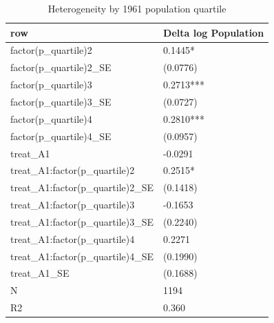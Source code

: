 \begin{table}

\caption{Heterogeneity by 1961 population quartile}
\centering
\begin{tabular}[t]{ll}
\toprule
row & Delta log Population\\
\midrule
factor(p\_quartile)2 & 0.1445*\\
factor(p\_quartile)2\_SE & (0.0776)\\
factor(p\_quartile)3 & 0.2713***\\
factor(p\_quartile)3\_SE & (0.0727)\\
factor(p\_quartile)4 & 0.2810***\\
\addlinespace
factor(p\_quartile)4\_SE & (0.0957)\\
treat\_A1 & -0.0291\\
treat\_A1:factor(p\_quartile)2 & 0.2515*\\
treat\_A1:factor(p\_quartile)2\_SE & (0.1418)\\
treat\_A1:factor(p\_quartile)3 & -0.1653\\
\addlinespace
treat\_A1:factor(p\_quartile)3\_SE & (0.2240)\\
treat\_A1:factor(p\_quartile)4 & 0.2271\\
treat\_A1:factor(p\_quartile)4\_SE & (0.1990)\\
treat\_A1\_SE & (0.1688)\\
N & 1194\\
\addlinespace
R2 & 0.360\\
\bottomrule
\end{tabular}
\end{table}
